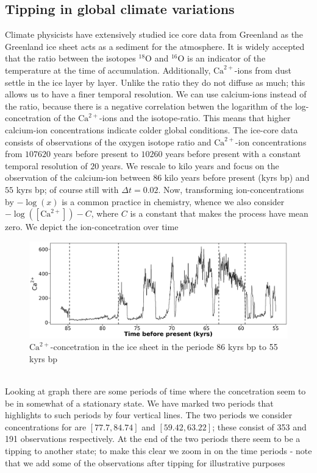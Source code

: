 \subsection{Tipping in global climate variations}
Climate physicists have extensively studied ice core data from Greenland as the Greenland ice sheet acts as a sediment for the atmosphere. It is widely accepted that the ratio between the isotopes $^{18}\mathrm{O}$ and $^{16}\mathrm{O}$ is an indicator of the temperature at the time of accumulation. Additionally, $\mathrm{Ca}^{2+}$-ions from dust settle in the ice layer by layer. Unlike the ratio they do not diffuse as much; this allows us to have a finer temporal resolution. We can use calcium-ions instead of the ratio, because there is a negative correlation betwen the logarithm of the log-concetration of the $\mathrm{Ca}^{2+}$-ions and the isotope-ratio. This means that higher calcium-ion concentrations indicate colder global conditions. The ice-core data consists of observations of the oxygen isotope ratio and $\mathrm{Ca}^{2+}$-ion concentrations from $107620$ years before present to $10260$ years before present with a constant temporal resolution of $20$ years. We rescale to kilo years and focus on the observation of the calcium-ion between $86$ kilo years before present (kyrs bp) and $55$ kyrs bp; of course still with $\Delta t = 0.02$. Now, transforming ion-concentrations by $-\log (x)$ is a common practice in chemistry, whence we also consider $-\log([\mathrm{Ca}^{2+}]) - C$, where $C$ is a constant that makes the process have mean zero. We depict the ion-concetration over time
\begin{figure}[h!]
    \begin{center}
    \includegraphics[scale = .075]{figures/ice_core_plot.jpeg}
    \caption{$\mathrm{Ca}^{2+}$-concetration in the ice sheet in the periode 86 kyrs bp to 55 kyrs bp}
    \label{figure:Ca_icesheet}
    \end{center}
\end{figure}\\
Looking at graph there are some periods of time where the concetration seem to be in somewhat of a stationary state. We have marked two periods that highlights to such periods by four vertical lines. The two periods we consider concentrations for are $[77.7, 84.74]$ and $[59.42, 63.22]$; these consist of 353 and 191 observations respectively. At the end of the two periods there seem to be a tipping to another state; to make this clear we zoom in on the time periods - note that we add some of the observations after tipping for illustrative purposes
